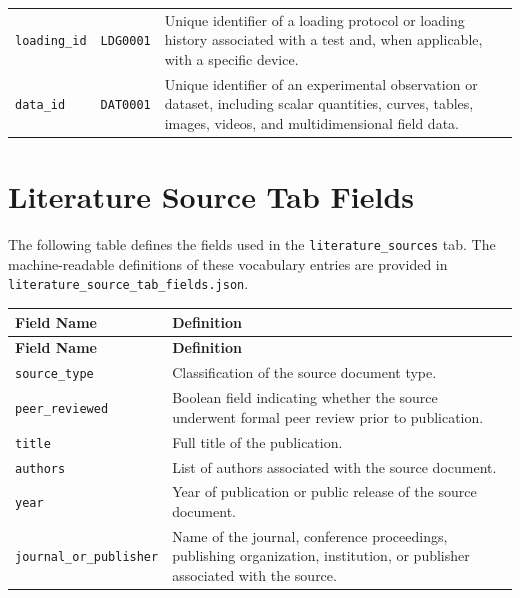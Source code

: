 \documentclass[11pt]{book}
\begin{document}
{\begin{longtable}{p{}p{}p{}}
\texttt{loading\_id} & \texttt{LDG0001} &
Unique identifier of a loading protocol or loading history associated with a test and, when applicable, with a specific device. \\

\texttt{data\_id} & \texttt{DAT0001} &
Unique identifier of an experimental observation or dataset, including scalar quantities, curves, tables, images, videos, and multidimensional field data. \\

\hline
\end{longtable}

\section{Literature Source Tab Fields}
\label{vocab:literature_source_tab_fields}

The following table defines the fields used in the \texttt{literature\_sources} tab. The machine-readable definitions of these vocabulary entries are provided in \texttt{literature\_source\_tab\_fields.json}.

\begin{longtable}{p{}p{}}
\hline
\textbf{Field Name} & \textbf{Definition} \\
\hline
\endfirsthead

\hline
\textbf{Field Name} & \textbf{Definition} \\
\hline
\endhead

\texttt{source\_type} &
Classification of the source document type. \\

\texttt{peer\_reviewed} &
Boolean field indicating whether the source underwent formal peer review prior to publication. \\

\texttt{title} &
Full title of the publication. \\

\texttt{authors} &
List of authors associated with the source document. \\

\texttt{year} &
Year of publication or public release of the source document. \\

\texttt{journal\_or\_publisher} &
Name of the journal, conference proceedings, publishing organization, institution, or publisher associated with the source. \\


\end{longtable}}
\end{document}
